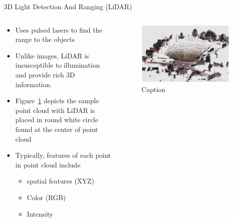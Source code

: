 \documentclass[aspectratio=169]{beamer}
\begin{document}
\begin{frame}{3D Light Detection And Ranging (LiDAR)}
    \begin{columns}
       \begin{column}{0.5\textwidth}
            \begin{itemize}
                \item Uses pulsed lasers to find the range to the objects
                \item Unlike images, LiDAR is insusceptible to illumination and provide rich 3D information.
                \item Figure~\ref{fig:sample_lidar_pc} depicts the sample point cloud with LiDAR is placed in round white circle found at the center of point cloud
                \item Typically, features of each point in point cloud include 
                \begin{itemize}
                    \item spatial features (XYZ)
                    \item Color (RGB)
                    \item Intensity
                \end{itemize}
            \end{itemize}
       \end{column}
       \begin{column}{0.5\textwidth}
            \begin{figure}
                \centering
                \includegraphics[scale=0.25]{images/sample_LiDAR_PC.jpg}
                \caption{Caption}
                \label{fig:sample_lidar_pc}
            \end{figure}
       \end{column}
    \end{columns}
\end{frame}
\end{document}
